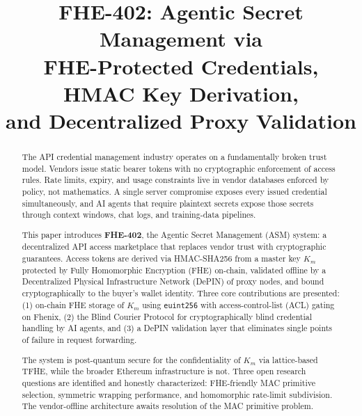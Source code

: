 \documentclass[conference]{IEEEtran}
\begin{document}
\title{FHE-402: Agentic Secret Management via\\
FHE-Protected Credentials, HMAC Key Derivation,\\
and Decentralized Proxy Validation}

\author{
}

\maketitle

\begin{abstract}
The API credential management industry operates on a fundamentally broken trust model.
Vendors issue static bearer tokens with no cryptographic enforcement of access rules.
Rate limits, expiry, and usage constraints live in vendor databases enforced by policy,
not mathematics. A single server compromise exposes every issued credential simultaneously,
and AI agents that require plaintext secrets expose those secrets through context windows,
chat logs, and training-data pipelines.

This paper introduces \textbf{FHE-402}, the Agentic Secret Management (ASM) system: a
decentralized API access marketplace that replaces vendor trust with cryptographic guarantees.
Access tokens are derived via HMAC-SHA256 from a master key $K_m$ protected by Fully
Homomorphic Encryption (FHE) on-chain, validated offline by a Decentralized Physical
Infrastructure Network (DePIN) of proxy nodes, and bound cryptographically to the buyer's
wallet identity. Three core contributions are presented: (1) on-chain FHE storage of
$K_m$ using \texttt{euint256} with access-control-list (ACL) gating on Fhenix, (2) the
Blind Courier Protocol for cryptographically blind credential handling by AI agents, and (3)
a DePIN validation layer that eliminates single points of failure in request forwarding.

The system is post-quantum secure for the confidentiality of $K_m$ via lattice-based
TFHE, while the broader Ethereum infrastructure is not. Three open research questions are
identified and honestly characterized: FHE-friendly MAC primitive selection, symmetric
wrapping performance, and homomorphic rate-limit subdivision. The vendor-offline architecture
awaits resolution of the MAC primitive problem.
\end{abstract}
\end{document}
